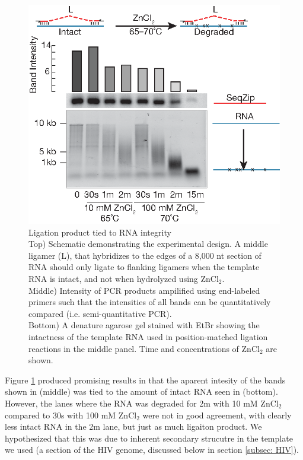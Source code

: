 	  \begin{figure}[htbp] %
    	\centering 
    	\includegraphics{Figures/SeqZipMethod/DegreadedRNABySeqZip.eps}
    	\caption[Ligation product tied to RNA integrity]
    	{
		    Ligation product tied to RNA integrity\\
      	Top) Schematic demonstrating the experimental design. A middle ligamer (L), that hybridizes to the edges of a 8,000 nt section of RNA should only ligate to flanking ligamers when the template RNA is intact, and not when hydrolyzed using ZnCl$_{2}$. \\
        Middle) Intensity of PCR products ampilified using end-labeled primers such that the intensities of all bands can be quantitatively compared (i.e. semi-quantitative PCR). \\
        Bottom) A denature agarose gel stained with EtBr showing the intactness of the template RNA used in position-matched ligation reactions in the middle panel. Time and concentrations of ZnCl$_{2}$ are shown.
    		}
    	\label{fig:Ligation product and RNA integrity}
  		\end{figure}

    Figure \ref{fig:Ligation product and RNA integrity} produced promising results in that the aparent intesity of the bands shown in (middle) was tied to the amount of intact RNA seen in (bottom). However, the lanes where the RNA was degraded for 2m with 10 mM ZnCl$_{2}$ compared to 30s with 100 mM ZnCl$_{2}$ were not in good agreement, with clearly less intact RNA in the 2m lane, but just as much ligaiton product. We hypothesized that this was due to inherent secondary strucutre in the template we used (a section of the HIV genome, discussed below in section \ref{subsec: HIV}). 

